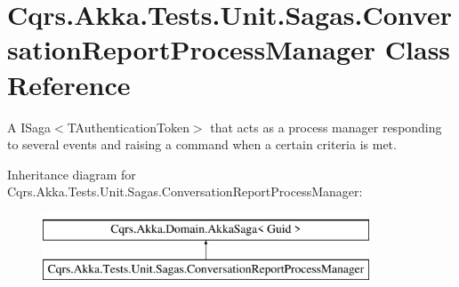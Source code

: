 \hypertarget{classCqrs_1_1Akka_1_1Tests_1_1Unit_1_1Sagas_1_1ConversationReportProcessManager}{}\section{Cqrs.\+Akka.\+Tests.\+Unit.\+Sagas.\+Conversation\+Report\+Process\+Manager Class Reference}
\label{classCqrs_1_1Akka_1_1Tests_1_1Unit_1_1Sagas_1_1ConversationReportProcessManager}


A I\+Saga$<$\+T\+Authentication\+Token$>$ that acts as a process manager responding to several events and raising a command when a certain criteria is met.  


Inheritance diagram for Cqrs.\+Akka.\+Tests.\+Unit.\+Sagas.\+Conversation\+Report\+Process\+Manager\+:\begin{figure}[H]
\begin{center}
\leavevmode
\includegraphics[height=2.000000cm]{classCqrs_1_1Akka_1_1Tests_1_1Unit_1_1Sagas_1_1ConversationReportProcessManager}
\end{center}
\end{figure}
